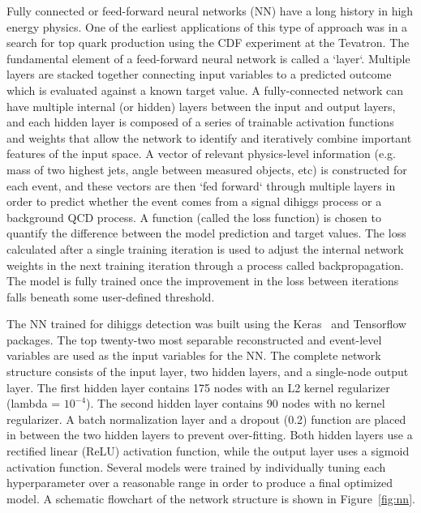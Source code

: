 \label{sec:NN}
Fully connected or feed-forward neural networks (NN) have a long history in high energy physics. One of the earliest applications of this type of approach was in a search for top quark production using the CDF experiment at the Tevatron. The fundamental element of a feed-forward neural network is called a `layer`. Multiple layers are stacked together connecting input variables to a predicted outcome which is evaluated against a known target value. A fully-connected network can have multiple internal (or hidden) layers between the input and output layers, and each hidden layer is composed of a series of trainable activation functions and weights that allow the network to identify and iteratively combine important features of the input space. A vector of relevant physics-level information (e.g. mass of two highest \pt jets, angle between measured objects, etc) is constructed for each event, and these vectors are then `fed forward` through multiple layers in order to predict whether the event comes from a signal dihiggs process or a background QCD process. A function (called the loss function) is chosen to quantify the difference between the model prediction and target values. The loss calculated after a single training iteration is used to adjust the internal network weights in the next training iteration through a process called backpropagation. The model is fully trained once the improvement in the loss between iterations falls beneath some user-defined threshold.

The NN trained for dihiggs detection was built using the Keras~\cite{chollet2015keras} and Tensorflow~\cite{tensorflow} packages. The top twenty-two most separable reconstructed and event-level variables are used as the input variables for the NN. The complete network structure consists of the input layer, two hidden layers, and a single-node output layer. The first hidden layer contains 175 nodes with an L2 kernel regularizer (lambda = $10^{-4}$). The second hidden layer contains 90 nodes with no kernel regularizer. A batch normalization layer and a dropout (0.2) function are placed in between the two hidden layers to prevent over-fitting. Both hidden layers use a rectified linear (ReLU) activation function, while the output layer uses a sigmoid activation function. Several models were trained by individually tuning each hyperparameter over a reasonable range in order to produce a final optimized model. A schematic flowchart of the network structure is shown in Figure~\ref{fig:nn}.

